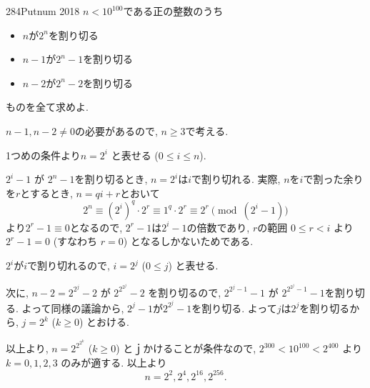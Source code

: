 \begin{thm}{284}{}{Putnum 2018}
    $n<10^{100}$である正の整数のうち
    \begin{itemize}
\item $n$が$2^n$を割り切る
\item $n-1$が$2^{n}-1$を割り切る
\item $n-2$が$2^{n}-2$を割り切る
    \end{itemize}
    ものを全て求めよ. 
\end{thm}

$n-1,n-2\neq 0$の必要があるので, $n\geq 3$で考える. 

1つめの条件より$n=2^i$ と表せる ($0\leq i\leq n$). 

$2^i - 1$ が $2^n-1$を割り切るとき, $n = 2^i$は$i$で割り切れる. 実際, $n$を$i$で割った余りを$r$とするとき, $n=qi + r$とおいて
$$
2^n \equiv (2^i)^q\cdot 2^r \equiv 1^q \cdot 2^r \equiv 2^r\pmod{(2^i - 1)} 
$$
より$2^r-1 \equiv 0$となるので, $2^r-1$は$2^i-1$の倍数であり, $r$の範囲 $0\leq r < i$ より $2^r-1 = 0$ (すなわち $r=0$) となるしかないためである. 

$2^i$が$i$で割り切れるので, $i = 2^j$ ($0\leq j$) と表せる. 

次に, $n - 2 = 2^{2^{j}} - 2$ が $2^{2^{2^{j}}} - 2$ を割り切るので, $2^{2^{j} - 1} - 1$ が $2^{2^{2^{j}} - 1} - 1$を割り切る. よって同様の議論から, $2^{j} - 1$が$2^{2^{j}} - 1$を割り切る. よって$j$は$2^{j}$を割り切るから, $j=2^k$ ($k\geq 0$) とおける. 

以上より, $n=2^{2^{2^{k}}}$ ($k\geq 0$) とｊかけることが条件なので, $2^{300}<10^{100}<2^{400}$ より $k=0,1,2,3$ のみが適する. 以上より
$$
n = 2^2, 2^4, 2^{16}, 2^{256}. 
$$